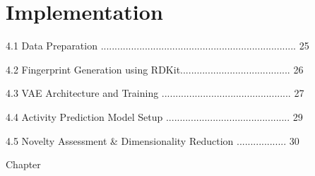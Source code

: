 \chapter{Implementation}
4.1 Data Preparation ....................................................................... 25 

4.2 Fingerprint Generation using RDKit........................................ 26 

4.3 VAE Architecture and Training ............................................... 27 

4.4 Activity Prediction Model Setup ............................................. 29 

4.5 Novelty Assessment \& Dimensionality Reduction .................. 30 

Chapter